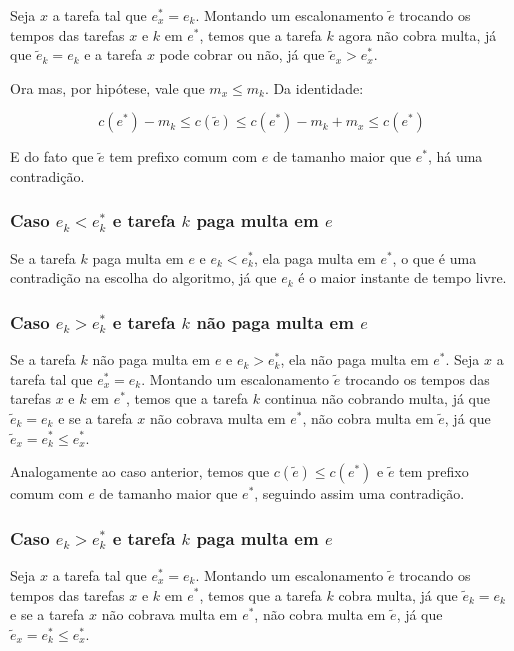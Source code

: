 Seja $x$ a tarefa tal que $e^*_x = e_k$. Montando um escalonamento $\widetilde{e}$ trocando os tempos das tarefas $x$ e $k$ em $e^*$, temos que a tarefa $k$ agora não cobra multa, já que $\widetilde{e}_k = e_k$ e a tarefa $x$ pode cobrar ou não, já que $\widetilde{e}_x > e^*_x$.

Ora mas, por hipótese, vale que $m_x \leq m_k$. Da identidade:

$$c(e^*) - m_k \leq c(\widetilde{e}) \leq c(e^*) - m_k + m_x \leq c(e^*)$$

E do fato que $\widetilde{e}$ tem prefixo comum com $e$ de tamanho maior que $e^*$, há uma contradição.

\subsubsection*{Caso $e_k < e^*_k$ e tarefa $k$ paga multa em $e$}

Se a tarefa $k$ paga multa em $e$ e $e_k < e^*_k$, ela paga multa em $e^*$, o que é uma contradição na escolha do algoritmo, já que $e_k$ é o maior instante de tempo livre.

\subsubsection*{Caso $e_k > e^*_k$ e tarefa $k$ não paga multa em $e$}

Se a tarefa $k$ não paga multa em $e$ e $e_k > e^*_k$, ela não paga multa em $e^*$. Seja $x$ a tarefa tal que $e^*_x = e_k$. Montando um escalonamento $\widetilde{e}$ trocando os tempos das tarefas $x$ e $k$ em $e^*$, temos que a tarefa $k$ continua não cobrando multa, já que $\widetilde{e}_k = e_k$ e se a tarefa $x$ não cobrava multa em $e^*$, não cobra multa em $\widetilde{e}$, já que $\widetilde{e}_x = e^*_k \leq e^*_x$.

Analogamente ao caso anterior, temos que $c(\widetilde{e}) \leq c(e^*)$ e $\widetilde{e}$ tem prefixo comum com $e$ de tamanho maior que $e^*$, seguindo assim uma contradição.

\subsubsection*{Caso $e_k > e^*_k$ e tarefa $k$ paga multa em $e$}

Seja $x$ a tarefa tal que $e^*_x = e_k$. Montando um escalonamento $\widetilde{e}$ trocando os tempos das tarefas $x$ e $k$ em $e^*$, temos que a tarefa $k$ cobra multa, já que $\widetilde{e}_k = e_k$ e se a tarefa $x$ não cobrava multa em $e^*$, não cobra multa em $\widetilde{e}$, já que $\widetilde{e}_x = e^*_k \leq e^*_x$.


